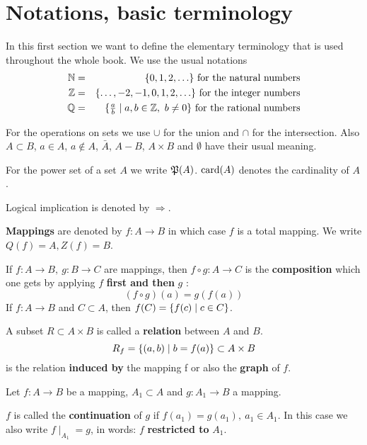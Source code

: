 \section{Notations, basic terminology}

In this first section we want to define the elementary terminology that is used
throughout the whole book. We use the usual notations
\begin{eqnarray*}
\mathbb{N} &=& \mbox{$\{0, 1, 2, \ldots\}$}\text{ for the natural numbers} \\
\mathbb{Z} &=& \mbox{$\{\ldots, -2, -1, 0, 1, 2, \ldots\}$}\text{ for the integer
numbers} \\
\mathbb{Q} &=& \mbox{$\{\frac{a}{b} \mid a,b \in \mathbb{Z},\ b \neq 0\}$}\text{
for the rational numbers}
\end{eqnarray*}

For the operations on sets we use $\cup$ for the union and $\cap$ for the
intersection. Also $A \subset B$, $a \in A$, $a \not\in A$, $\bar{A}$, $A - B$,
$A \times B$ and $\emptyset$ have their usual meaning.

For the power set of a set $A$ we write $\mathfrak{P}(A)$. $\mathrm{card}(A)$ denotes
the cardinality of $A$.

Logical implication is denoted by $\Rightarrow$.

{\bf Mappings} are denoted by $f : A \to B$ in which case $f$ is a
total mapping. We write $Q(f) = A, Z(f) = B$. 


If $f: A \to B,\ g : B \to C$ are mappings, then $f \circ g : A
\to C$ is the {\bf composition} which one gets by applying
\boldmath $f$ {\bf first and then} $g$ \unboldmath: 
\[(f \circ g)(a) = g(f(a))\]
If $f:A \to B$ and $C \subset A$, then $f(C) = \mbox{$\{f(c) \mid c \in C \}$}$.


A subset $R \subset A \times B$ is called a {\bf relation} between $A$ and $B$.
\[R_f = \mbox{$\{(a,b) \mid b = f(a) \}$} \subset A \times B\] 
is the relation {\bf induced by} the mapping f or also the {\bf graph} of $f$.

Let $f : A \to B$ be a mapping, $A_1 \subset A$ and $g : A_1 \to
B$ a mapping. 

$f$ is called the {\bf continuation} of $g$ if $f(a_1) = g(a_1),\ a_1 \in A_1$.
In this case we also write $f \mid _{A_1} = g$, in words: $f$ {\bf restricted to} $A_1$.

